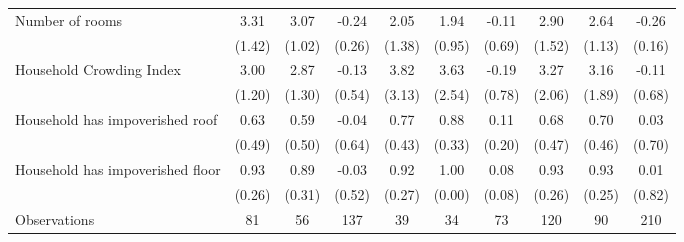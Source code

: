\begin{tabular}{l*{9}c}
Number of rooms&3.31&3.07&-0.24&2.05&1.94&-0.11&2.90&2.64&-0.26\\
&(1.42)&(1.02)&(0.26)&(1.38)&(0.95)&(0.69)&(1.52)&(1.13)&(0.16)\\
Household Crowding Index&3.00&2.87&-0.13&3.82&3.63&-0.19&3.27&3.16&-0.11\\
&(1.20)&(1.30)&(0.54)&(3.13)&(2.54)&(0.78)&(2.06)&(1.89)&(0.68)\\
Household has impoverished roof&0.63&0.59&-0.04&0.77&0.88&0.11&0.68&0.70&0.03\\
&(0.49)&(0.50)&(0.64)&(0.43)&(0.33)&(0.20)&(0.47)&(0.46)&(0.70)\\
Household has impoverished floor&0.93&0.89&-0.03&0.92&1.00&0.08&0.93&0.93&0.01\\
&(0.26)&(0.31)&(0.52)&(0.27)&(0.00)&(0.08)&(0.26)&(0.25)&(0.82)\\
\hline
Observations & 81 & 56 & 137 & 39 & 34 & 73 & 120 & 90 & 210 \\
\hline\hline
\end{tabular}
